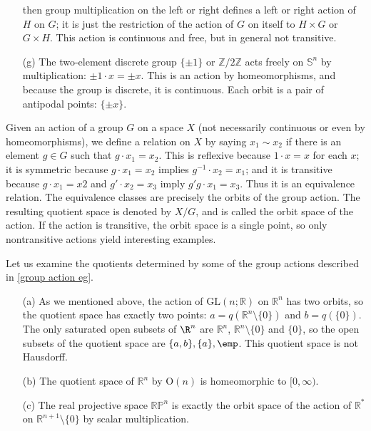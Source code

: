 \begin{example}
\begin{itemize}
then group multiplication on the left or right defines a left or right action of $H$ on $G$; it is just the restriction of the action of $G$ on itself to $H\times G$ or $G\times H$. This action is continuous and free, but in general not transitive.
\item[(g)] The two-element discrete group $\{\pm1\}$ or $\mathbb{Z}/2\mathbb{Z}$ acts freely on $\mathbb{S}^n$ by multiplication: $\pm1\cdot x=\pm x$. This is an action by homeomorphisms, and because the group is discrete, it is continuous. Each orbit is a pair of antipodal points: $\{\pm x\}$.
\end{itemize}
\end{example}
Given an action of a group $G$ on a space $X$ (not necessarily continuous or even
by homeomorphisms), we define a relation on $X$ by saying $x_1\sim x_2$ if there is an
element $g\in G$ such that $g\cdot x_1=x_2$. This is reflexive because $1\cdot x=x$ for each $x$; it is symmetric because $g\cdot x_1=x_2$ implies $g^{-1}\cdot x_2=x_1$; and it is transitive because $g\cdot x_1 =x2$ and $g'\cdot x_2=x_3$ imply $g'g\cdot x_1=x_3$. Thus it is an equivalence relation. The equivalence classes are precisely the orbits of the group action. The resulting quotient space is denoted by $X/G$, and is called the orbit space of the action. If the action is transitive, the orbit space is a single point, so only nontransitive actions
yield interesting examples.\par
Let us examine the quotients determined by some of the group actions described in \cref{group action eg}.
\begin{example}
\mbox{}
\begin{itemize}
\item[(a)] As we mentioned above, the action of $\mathrm{GL}(n;\mathbb{R})$ on $\mathbb{R}^n$  has two orbits, so the quotient space has exactly two points: $a=q(\mathbb{R}^n\setminus\{0\})$ and $b=q(\{0\})$. The only saturated open subsets of $\R^n$ are $\mathbb{R}^n$, $\mathbb{R}^n\setminus\{0\}$ and $\{0\}$, so the open subsets of the quotient space are $\{a,b\},\{a\},\emp$. This quotient space is not Hausdorff.
\item[(b)] The quotient space of $\mathbb{R}^n$ by $\mathrm{O}(n)$ is homeomorphic to $[0,\infty)$.
\item[(c)] The real projective space $\mathbb{RP}^n$  is exactly the orbit space of the action of $\mathbb{R}^*$ on $\mathbb{R}^{n+1}\setminus\{0\}$ by scalar multiplication.
\end{itemize}
\end{example}
